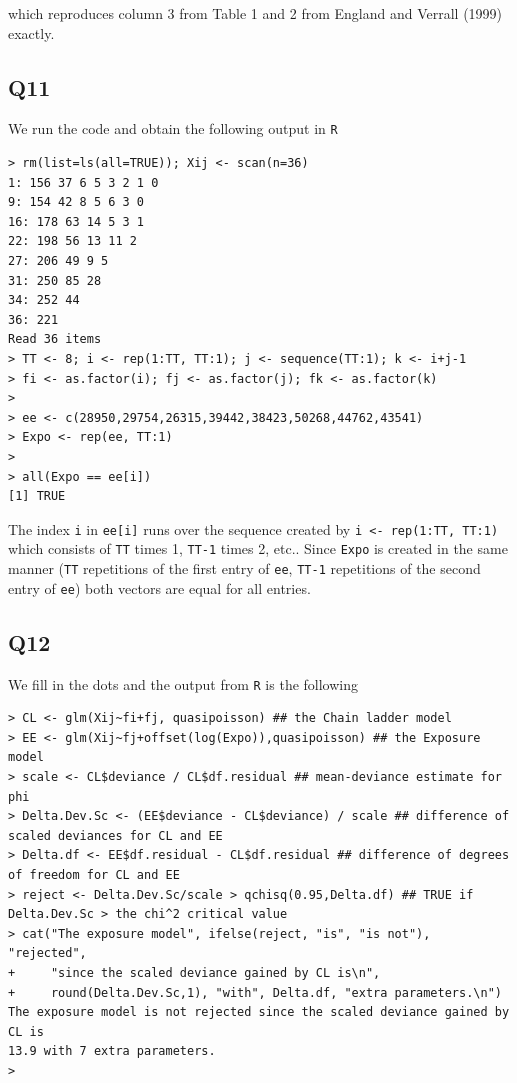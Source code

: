 \documentclass[11pt]{article}
\begin{document}
which reproduces column 3 from Table 1 and 2 from England and Verrall (1999) exactly.

\subsection*{Q11}
We run the code and obtain the following output in \verb|R|

\begin{verbatim}
> rm(list=ls(all=TRUE)); Xij <- scan(n=36)
1: 156 37 6 5 3 2 1 0
9: 154 42 8 5 6 3 0
16: 178 63 14 5 3 1
22: 198 56 13 11 2
27: 206 49 9 5
31: 250 85 28
34: 252 44
36: 221
Read 36 items
> TT <- 8; i <- rep(1:TT, TT:1); j <- sequence(TT:1); k <- i+j-1
> fi <- as.factor(i); fj <- as.factor(j); fk <- as.factor(k)
> 
> ee <- c(28950,29754,26315,39442,38423,50268,44762,43541)
> Expo <- rep(ee, TT:1)
> 
> all(Expo == ee[i])
[1] TRUE
\end{verbatim}

The index \verb|i| in \verb|ee[i]| runs over the sequence created by \verb|i <- rep(1:TT, TT:1)| which consists of \verb|TT| times 1, \verb|TT-1| times 2, etc.. Since \verb|Expo| is created in the same manner (\verb|TT| repetitions of the first entry of \verb|ee|, \verb|TT-1| repetitions of the second entry of \verb|ee|) both vectors are equal for all entries.

\subsection*{Q12}
We fill in the dots and the output from \verb|R| is the following

\begin{verbatim}
> CL <- glm(Xij~fi+fj, quasipoisson) ## the Chain ladder model
> EE <- glm(Xij~fj+offset(log(Expo)),quasipoisson) ## the Exposure model
> scale <- CL$deviance / CL$df.residual ## mean-deviance estimate for phi
> Delta.Dev.Sc <- (EE$deviance - CL$deviance) / scale ## difference of scaled deviances for CL and EE
> Delta.df <- EE$df.residual - CL$df.residual ## difference of degrees of freedom for CL and EE
> reject <- Delta.Dev.Sc/scale > qchisq(0.95,Delta.df) ## TRUE if Delta.Dev.Sc > the chi^2 critical value
> cat("The exposure model", ifelse(reject, "is", "is not"), "rejected",
+     "since the scaled deviance gained by CL is\n",
+     round(Delta.Dev.Sc,1), "with", Delta.df, "extra parameters.\n")
The exposure model is not rejected since the scaled deviance gained by CL is
13.9 with 7 extra parameters.
>
\end{verbatim}
\end{document}
